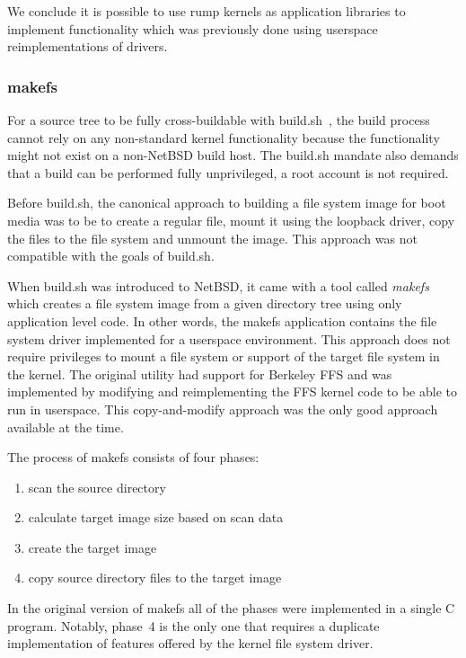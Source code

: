 We conclude it is possible to use rump kernels as application
libraries to implement functionality which was previously done
using userspace reimplementations of drivers.

\subsubsection{makefs}
\label{sect:makefs}

For a source tree to be fully cross-buildable with
build.sh~\cite{mewburn:build.sh}, the build process cannot rely on
any non-standard kernel functionality because the
functionality might not exist on a non-NetBSD build host.
The build.sh mandate also demands that
a build can be performed fully unprivileged, \ie a root account is
not required.

Before build.sh, the canonical approach to building a file system
image for boot media was to be to create a regular file, mount it
using the loopback driver, copy the files to the file system and
unmount the image.  This approach was not compatible with the goals
of build.sh.

When build.sh was introduced to NetBSD, it came with a tool called
\textit{makefs} which creates a file system image from a given
directory tree using only application level code.  In other words,
the makefs application contains the file system driver implemented
for a userspace environment.  This approach does not require
privileges to mount a file system or support of the target file
system in the kernel.  The original utility had support for Berkeley
FFS and was implemented by modifying and reimplementing the FFS
kernel code to be able to run in userspace.  This copy-and-modify approach
was the only good approach available at the time.

The process of makefs consists of four phases:
\begin{enumerate}
\item   scan the source directory
\item   calculate target image size based on scan data
\item   create the target image
\item   copy source directory files to the target image
\end{enumerate}

In the original version of makefs all of the phases were implemented
in a single C program.  Notably, phase~4 is the only one that
requires a duplicate implementation of features offered by the
kernel file system driver.

